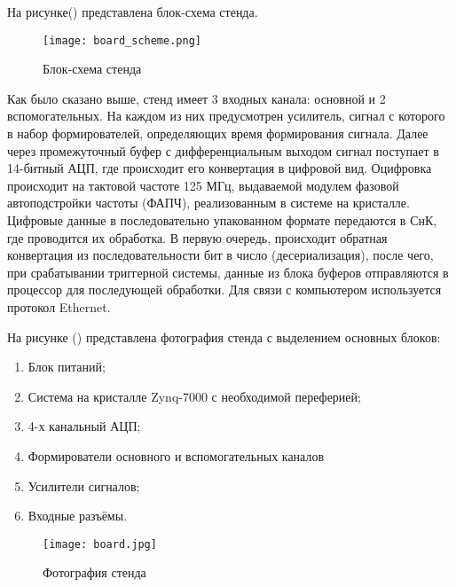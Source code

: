На рисунке() представлена блок-схема стенда.\par
\begin{figure}[ht]
    \centering
    \texttt{[image: board\_scheme.png]}
    \caption{Блок-схема стенда}
    \label{fig:mpr}
\end{figure}
Как было сказано выше, стенд имеет 3 входных канала: основной и 2 вспомогательных. На каждом из них предусмотрен усилитель, сигнал с которого в набор формирователей, определяющих время формирования сигнала. Далее через промежуточный буфер с дифференциальным выходом сигнал поступает в 14-битный АЦП, где происходит его конвертация в цифровой вид. Оцифровка происходит на тактовой частоте 125 МГц, выдаваемой модулем фазовой автоподстройки частоты (ФАПЧ), реализованным в системе на кристалле. Цифровые данные в последовательно упакованном формате передаются в СнК, где проводится их обработка. В первую очередь, происходит обратная конвертация из последовательности бит в число (десериализация), после чего, при срабатывании триггерной системы, данные из блока буферов отправляются в процессор для последующей обработки. Для связи с компьютером используется протокол Ethernet.\par

На рисунке () представлена фотография стенда с выделением основных блоков:\par
\begin{enumerate}
    \item Блок питаний;
    \item Система на кристалле Zynq-7000 с необходимой переферией;
    \item 4-х канальный АЦП;
    \item Формирователи основного и вспомогательных каналов
    \item Усилители сигналов;
    \item Входные разъёмы. 
\end{enumerate}

\begin{figure}[ht]
    \centering
    \texttt{[image: board.jpg]}
    \caption{Фотография стенда}
    \label{fig:mpr}
\end{figure}

